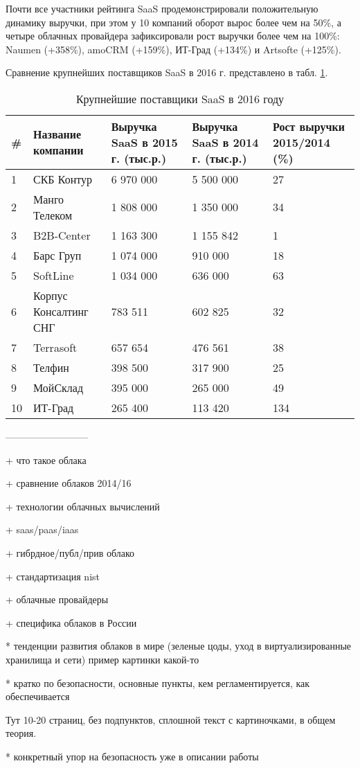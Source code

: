 Почти все участники рейтинга SaaS продемонстрировали положительную динамику выручки, при этом у 10 компаний оборот вырос более чем на 50\%, а четыре облачных провайдера зафиксировали рост выручки более чем на 100\%: Naumen (+358\%), amoCRM (+159\%), ИТ-Град (+134\%) и Artsofte (+125\%).

Сравнение крупнейших поставщиков SaaS в 2016 г. \cite{cnews} представлено в табл. \ref{saas-table}.
\begin{table}[H]
  \caption{Крупнейшие поставщики SaaS в 2016 году}\label{saas-table}
  \begin{tabular}{|p{0.5cm}|p{3.5cm}|p{3.5cm}|p{3.5cm}|p{3.5cm}|}
  \hline \# & Название компании & Выручка SaaS в 2015 г. (тыс.р.) & Выручка SaaS в 2014 г. (тыс.р.) & Рост выручки 2015/2014 (\%) \\
  \hline 1 & СКБ Контур & 6 970 000 & 5 500 000 & 27 \\
  \hline 2 & Манго Телеком & 1 808 000 & 1 350 000 & 34 \\
  \hline 3 & B2B-Center & 1 163 300 & 1 155 842 & 1 \\
  \hline 4 & Барс Груп & 1 074 000 & 910 000 & 18 \\
  \hline 5 & SoftLine & 1 034 000 & 636 000 & 63 \\
  \hline 6 & Корпус Консалтинг СНГ & 783 511 & 602 825 & 32 \\
  \hline 7 & Terrasoft & 657 654 & 476 561 & 38 \\
  \hline 8 & Телфин & 398 500 & 317 900 & 25 \\
  \hline 9 & МойСклад & 395 000 & 265 000 & 49 \\
  \hline 10 & ИТ-Град & 265 400 & 113 420 & 134 \\
  \hline
  \end{tabular}
\end{table}

--------------------------

+ что такое облака

+ сравнение облаков 2014/16

+ технологии облачных вычислений

+ saas/paas/iaas

+ гибрдное/публ/прив облако

+ стандартизация nist

+ облачные провайдеры

+ специфика облаков в России

* тенденции развития облаков в мире (зеленые цоды, уход в виртуализированные хранилища и сети) пример картинки какой-то

* кратко по безопасности, основные пункты, кем регламентируется, как обеспечивается

Тут 10-20 страниц, без подпунктов, сплошной текст с картиночками, в общем теория.

* конкретный упор на безопасность уже в описании работы

\clearpage
